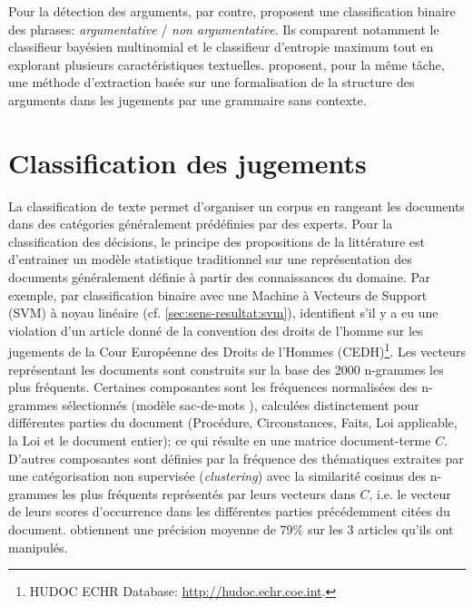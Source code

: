  Pour la détection des arguments, par contre, \citet{moens2007NBvsMaxent4arguments} proposent une classification binaire des phrases: \textit{argumentative} / \textit{non argumentative}. Ils comparent notamment le classifieur bayésien multinomial et le classifieur d'entropie maximum tout en explorant plusieurs caractéristiques textuelles. \citet{mochales2008contextfreegrammararg} proposent, pour la même tâche, une méthode d'extraction basée sur une formalisation de la structure des arguments dans les jugements par une grammaire sans contexte. 


\section{Classification des jugements}
La classification de texte permet d'organiser un corpus en rangeant les documents dans des catégories généralement prédéfinies par des experts. Pour la classification des décisions, le principe des propositions de la littérature est d'entrainer un modèle statistique traditionnel sur une représentation des documents généralement définie à partir des connaissances du domaine.%
 Par exemple, par classification binaire avec une Machine à Vecteurs de Support (SVM) \citep{vapnik1995statlearning} à noyau linéaire (cf. \ref{sec:sens-resultat:svm}),  \citet{Aletras2016predictDecisionECHR} identifient s'il y a eu une violation d'un article donné de la convention des droits de l'homme sur les jugements de la Cour Européenne des Droits de l'Hommes (CEDH)\footnote{HUDOC ECHR Database: \url{http://hudoc.echr.coe.int}.}. Les vecteurs représentant les documents sont construits sur la base des 2000 n-grammes les plus fréquents. Certaines composantes  sont les fréquences normalisées des n-grammes sélectionnés (modèle sac-de-mots \citep{salton1975BoW, salton1983modernIR_BoW}), calculées distinctement pour différentes parties du document (Procédure, Circonstances, Faits, Loi applicable, la Loi et le document entier); ce qui résulte en une matrice document-terme $C$. D'autres composantes sont définies par la fréquence des thématiques extraites par une catégorisation non supervisée (\textit{clustering}) avec la similarité cosinus des n-grammes les plus fréquents représentés par leurs vecteurs dans $C$, i.e. le vecteur de leurs scores d'occurrence dans les différentes parties précédemment citées du document. \citet{Aletras2016predictDecisionECHR} obtiennent une précision moyenne de 79\% sur les 3 articles qu'ils ont manipulés. 
